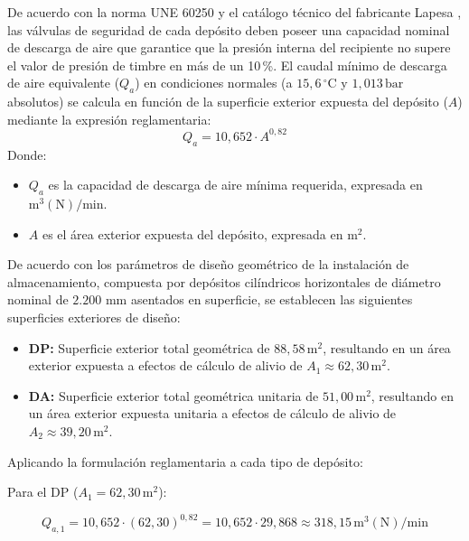 \documentclass[12pt]{article}
\begin{document}
        De acuerdo con la norma UNE 60250 \cite{une60250} y el catálogo técnico del fabricante Lapesa \cite{lapesa}, las válvulas de seguridad de cada depósito deben poseer una capacidad nominal de descarga de aire que garantice que la presión interna del recipiente no supere el valor de presión de timbre en más de un 10\,\%. El caudal mínimo de descarga de aire equivalente ($Q_a$) en condiciones normales (a $15,6\,^{\circ}\text{C}$ y $1,013\,\text{bar}$ absolutos) se calcula en función de la superficie exterior expuesta del depósito ($A$) mediante la expresión reglamentaria:
        \begin{equation}
            Q_a = 10,652 \cdot A^{0,82}
        \end{equation}
        Donde:
        \begin{itemize}
            \item $Q_a$ es la capacidad de descarga de aire mínima requerida, expresada en $\text{m}^3(\text{N})/\text{min}$.
            \item $A$ es el área exterior expuesta del depósito, expresada en $\text{m}^2$.
        \end{itemize}

        De acuerdo con los parámetros de diseño geométrico de la instalación de almacenamiento, compuesta por depósitos cilíndricos horizontales de diámetro nominal de $2.200\text{ mm}$ asentados en superficie, se establecen las siguientes superficies exteriores de diseño:
        \begin{itemize}
            \item \textbf{DP:} Superficie exterior total geométrica de $88,58\,\text{m}^2$, resultando en un área exterior expuesta a efectos de cálculo de alivio de $A_1 \approx 62,30\,\text{m}^2$.
            \item \textbf{DA:} Superficie exterior total geométrica unitaria de $51,00\,\text{m}^2$, resultando en un área exterior expuesta unitaria a efectos de cálculo de alivio de $A_2 \approx 39,20\,\text{m}^2$.
        \end{itemize}

        Aplicando la formulación reglamentaria a cada tipo de depósito:
        
        Para el DP ($A_1 = 62,30\,\text{m}^2$):

            \begin{equation}
                Q_{a, 1} = 10,652 \cdot (62,30)^{0,82} = 10,652 \cdot 29,868 \approx 318,15\,\text{m}^3(\text{N})/\text{min}
            \end{equation}
        
\end{document}
